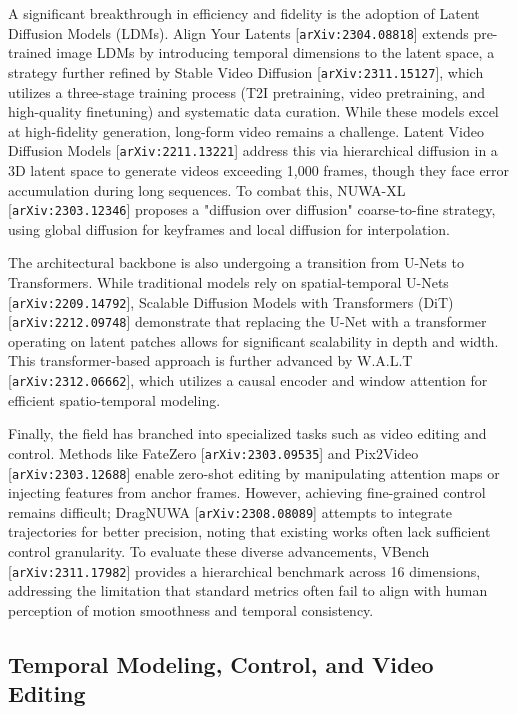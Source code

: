 \documentclass[11pt]{article}
\begin{document}
A significant breakthrough in efficiency and fidelity is the adoption of Latent Diffusion Models (LDMs). Align Your Latents [\texttt{arXiv:2304.08818}] extends pre-trained image LDMs by introducing temporal dimensions to the latent space, a strategy further refined by Stable Video Diffusion [\texttt{arXiv:2311.15127}], which utilizes a three-stage training process (T2I pretraining, video pretraining, and high-quality finetuning) and systematic data curation. While these models excel at high-fidelity generation, long-form video remains a challenge. Latent Video Diffusion Models [\texttt{arXiv:2211.13221}] address this via hierarchical diffusion in a 3D latent space to generate videos exceeding 1,000 frames, though they face error accumulation during long sequences. To combat this, NUWA-XL [\texttt{arXiv:2303.12346}] proposes a "diffusion over diffusion" coarse-to-fine strategy, using global diffusion for keyframes and local diffusion for interpolation.

The architectural backbone is also undergoing a transition from U-Nets to Transformers. While traditional models rely on spatial-temporal U-Nets [\texttt{arXiv:2209.14792}], Scalable Diffusion Models with Transformers (DiT) [\texttt{arXiv:2212.09748}] demonstrate that replacing the U-Net with a transformer operating on latent patches allows for significant scalability in depth and width. This transformer-based approach is further advanced by W.A.L.T [\texttt{arXiv:2312.06662}], which utilizes a causal encoder and window attention for efficient spatio-temporal modeling.

Finally, the field has branched into specialized tasks such as video editing and control. Methods like FateZero [\texttt{arXiv:2303.09535}] and Pix2Video [\texttt{arXiv:2303.12688}] enable zero-shot editing by manipulating attention maps or injecting features from anchor frames. However, achieving fine-grained control remains difficult; DragNUWA [\texttt{arXiv:2308.08089}] attempts to integrate trajectories for better precision, noting that existing works often lack sufficient control granularity. To evaluate these diverse advancements, VBench [\texttt{arXiv:2311.17982}] provides a hierarchical benchmark across 16 dimensions, addressing the limitation that standard metrics often fail to align with human perception of motion smoothness and temporal consistency.

\subsection{Temporal Modeling, Control, and Video Editing}
\end{document}

